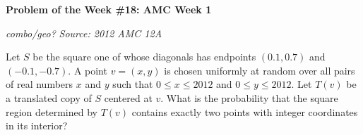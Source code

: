 \begin{potw}\vspace{5pt}
{\large\textbf{Problem of the Week \#18: AMC Week 1}}\vspace{5pt}

\textit{combo/geo?}\newline
\textit{Source: 2012 AMC 12A}\V

Let $S$ be the square one of whose diagonals has endpoints $(0.1,0.7)$ and $(-0.1,-0.7)$. A point $v=(x,y)$ is chosen uniformly at random over all pairs of real numbers $x$ and $y$ such that $0 \le x \le 2012$ and $0\le y\le 2012$. Let $T(v)$ be a translated copy of $S$ centered at $v$. What is the probability that the square region determined by $T(v)$ contains exactly two points with integer coordinates in its interior?
\end{potw}\V
